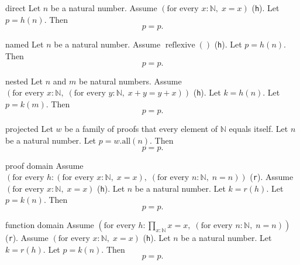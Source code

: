 \begin{cleanresult}{direct}
Let $n$ be a natural number.
Assume $\left(\text{for every }x : \mathbb{N},\; x = x\right)$ (\texttt{h}).
Let $p = h(n)$.
Then \[p = p.\]
\end{cleanresult}

\begin{cleanresult}{named}
Let $n$ be a natural number.
Assume $\operatorname{reflexive}()$ (\texttt{h}).
Let $p = h(n)$.
Then \[p = p.\]
\end{cleanresult}

\begin{cleanresult}{nested}
Let $n$ and $m$ be natural numbers.
Assume $\left(\text{for every }x : \mathbb{N},\; \left(\text{for every }y : \mathbb{N},\; x + y = y + x\right)\right)$ (\texttt{h}).
Let $k = h(n)$.
Let $p = k(m)$.
Then \[p = p.\]
\end{cleanresult}

\begin{cleanresult}{projected}
Let $w$ be a family of proofs that every element of $\mathbb{N}$ equals itself.
Let $n$ be a natural number.
Let $p = w.\mathrm{all}(n)$.
Then \[p = p.\]
\end{cleanresult}

\begin{cleanresult}{proof domain}
Assume $\left(\text{for every }h : \left(\text{for every }x : \mathbb{N},\; x = x\right),\; \left(\text{for every }n : \mathbb{N},\; n = n\right)\right)$ (\texttt{r}).
Assume $\left(\text{for every }x : \mathbb{N},\; x = x\right)$ (\texttt{h}).
Let $n$ be a natural number.
Let $k = r(h)$.
Let $p = k(n)$.
Then \[p = p.\]
\end{cleanresult}

\begin{cleanresult}{function domain}
Assume $\left(\text{for every }h : \prod_{x:\mathbb{N}} x = x,\; \left(\text{for every }n : \mathbb{N},\; n = n\right)\right)$ (\texttt{r}).
Assume $\left(\text{for every }x : \mathbb{N},\; x = x\right)$ (\texttt{h}).
Let $n$ be a natural number.
Let $k = r(h)$.
Let $p = k(n)$.
Then \[p = p.\]
\end{cleanresult}


